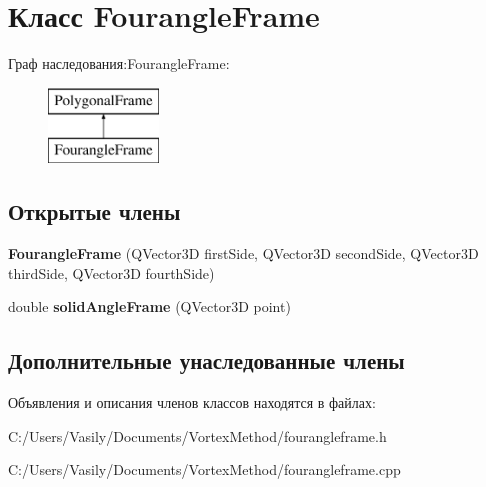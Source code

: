 \hypertarget{class_fourangle_frame}{}\section{Класс Fourangle\+Frame}
\label{class_fourangle_frame}
Граф наследования\+:Fourangle\+Frame\+:\begin{figure}[H]
\begin{center}
\leavevmode
\includegraphics[height=2.000000cm]{class_fourangle_frame}
\end{center}
\end{figure}
\subsection*{Открытые члены}
\begin{DoxyCompactItemize}
\item 
\mbox{\label{class_fourangle_frame_a2abc3789bd6213d5a423a75e40b718d6}} 
{\bfseries Fourangle\+Frame} (Q\+Vector3D first\+Side, Q\+Vector3D second\+Side, Q\+Vector3D third\+Side, Q\+Vector3D fourth\+Side)
\item 
\mbox{\label{class_fourangle_frame_aa787f177b9d472fc07620c5e4671813b}} 
double {\bfseries solid\+Angle\+Frame} (Q\+Vector3D point)
\end{DoxyCompactItemize}
\subsection*{Дополнительные унаследованные члены}


Объявления и описания членов классов находятся в файлах\+:\begin{DoxyCompactItemize}
\item 
C\+:/\+Users/\+Vasily/\+Documents/\+Vortex\+Method/fourangleframe.\+h\item 
C\+:/\+Users/\+Vasily/\+Documents/\+Vortex\+Method/fourangleframe.\+cpp\end{DoxyCompactItemize}
